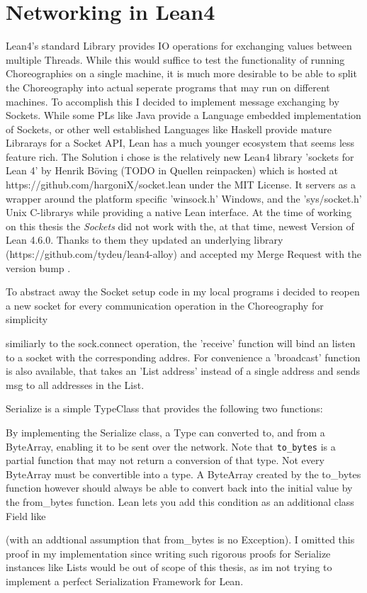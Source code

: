 \section{Networking in Lean4}
Lean4's standard Library provides IO operations for exchanging values between multiple Threads. While this would suffice to test the functionality of running Choreographies on a single machine, it is much more desirable to be able to split the Choreography into actual seperate programs that may run on different machines. To accomplish this I decided to implement message exchanging by Sockets.
While some PLs like Java provide a Language embedded implementation of Sockets, or other well established Languages like Haskell provide mature Librarays for a Socket API, Lean has a much younger ecosystem that seems less feature rich. The Solution i chose is the relatively new Lean4 library 'sockets for Lean 4' by Henrik Böving (TODO in Quellen reinpacken) which is hosted at https://github.com/hargoniX/socket.lean under the MIT License. It servers as a wrapper around the platform specific 'winsock.h' Windows, and the 'sys/socket.h' Unix C-librarys while providing a native Lean interface. At the time of working on this thesis the \emph{Sockets} did not work with the, at that time, newest Version of Lean 4.6.0. Thanks to them they updated an underlying library (https://github.com/tydeu/lean4-alloy) and accepted my Merge Request with the version bump \cite{test}.
\par
To abstract away the Socket setup code in my local programs i decided to reopen a new socket for every communication operation in the Choreography for simplicity



similiarly to the sock.connect operation, the 'receive' function will bind an listen to a socket with the corresponding addres. For convenience a 'broadcast' function is also available, that takes an 'List address' instead of a single address and sends msg to all addresses in the List.

Serialize is a simple TypeClass that provides the following two functions:

By implementing the Serialize class, a Type can converted to, and from a ByteArray, enabling it to be sent over the network. Note that \lstinline!to_bytes! is a partial function that may not return a conversion of that type. Not every ByteArray must be convertible into a type. A ByteArray created by the to_bytes function however should always be able to convert back into the initial value by the from_bytes function. Lean lets you add this condition as an additional class Field like

(with an addtional assumption that from_bytes is no Exception). I omitted this proof in my implementation since writing such rigorous proofs for Serialize instances like Lists would be out of scope of this thesis, as im not trying to implement a perfect Serialization Framework for Lean.

